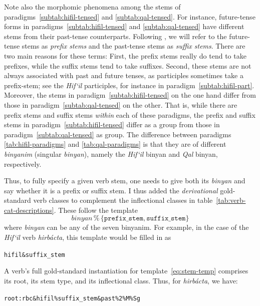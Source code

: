 {Note also the morphomic phenomena among the stems of  paradigms~\ref{subtab:hifil-tensed} and \ref{subtab:qal-tensed}.
For instance, future-tense forms in paradigms~\ref{subtab:hifil-tensed} and \ref{subtab:qal-tensed} have different stems from their past-tense counterparts. Following \citet{vance:2004}, we will refer to the future-tense stems as \emph{prefix stems} and the past-tense stems as \emph{suffix stems}. There are two main reasons for these terms: First, the prefix stems really do tend to take prefixes, while the suffix stems tend to take suffixes. Second, these stems are not always associated with past and future tenses, as participles sometimes take a prefix-stem; see the \textit{Hif`il} participles, for instance in paradigm~\ref{subtab:hifil-part}. 
Moreover, the stems in paradigm~\ref{subtab:hifil-tensed} on the one hand differ from those in paradigm~\ref{subtab:qal-tensed} on the other. That is, while there are prefix stems and suffix stems \emph{within} each of these paradigms, the prefix and suffix stems in paradigm~\ref{subtab:hifil-tensed} differ as a group from those in paradigm~\ref{subtab:qal-tensed} as group. The difference between paradigms \ref{tab:hifil-paradigms} and  \ref{tab:qal-paradigms} is that they are of different \emph{binyanim} (singular \emph{binyan}), namely the \emph{Hif`il} binyan and \emph{Qal} binyan, respectively.
 
 Thus, to fully specify a given verb stem, one needs to give both its \emph{binyan} and say whether it is a prefix or suffix stem. I thus added the \emph{derivational} gold-standard verb classes to complement the inflectional classes in table~\ref{tab:verb-cat-descriptions}. These follow the template
 \begin{equation}\label{eq:stem-temp}
\textit{binyan}  \, \texttt{\%} \, \{ \texttt{prefix\_stem}, \texttt{suffix\_stem} \}
 \end{equation}
 where \textit{binyan} can be any of the seven binyanim. For example, in the case of the \emph{Hif`il} verb \textit{hirb\'{a}cta}, this template would be filled in as 
  \begin{center}
    \texttt{hifil\&suffix\_stem}
  \end{center}
 A verb's full gold-standard instantiation for template~\eqref{eq:stem-temp} comprises its root, its stem type, and its inflectional class. Thus, for \textit{hirb\'{a}cta}, we have:
\begin{center}
\texttt{root:rbc\&hifil\%suffix\_stem\&past\%2\%M\%Sg}
 \end{center}
 
}
